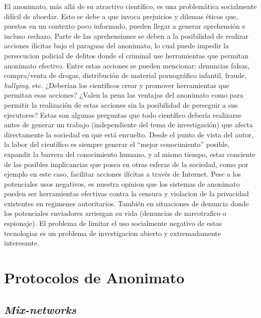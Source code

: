 El anonimato, más allá de su atractivo científico, es una problemática socialmente difícil de abordar. Esto se debe a que 
invoca prejuicios y dilemas éticos que, puestos en un contexto poco informado, pueden llegar a generar 
aprehensión e incluso rechazo. Parte de las aprehensiones se deben a la posibilidad de realizar acciones ilícitas 
bajo el paraguas del anonimato, lo cual puede impedir la persecucion policial de delitos donde el criminal use herramientas que permitan anonimato efectivo. Entre estas acciones se pueden mencionar: 
denuncias falsas, compra/venta de drogas, distribución de material pornográfico infantil, fraude, \emph{bullying}, etc. 
¿Deberían los científicos crear y promover herramientas que permitan esas acciones? 
¿Valen la pena las ventajas del anonimato como para permitir la realización de estas acciones sin la posibilidad de 
perseguir a sus ejecutores?
Estas son algunas preguntas que todo científico 
debería realizarse antes de generar un trabajo (independiente del tema de investigación) que afecta directamente la sociedad en que está envuelto. 
Desde el punto de vista 
del autor, la labor del científico es siempre generar el ``mejor conocimiento'' posible, expandir la barrera del conocimiento 
humano, y al mismo tiempo, estar conciente de las posibles implicancias que posea en otras esferas de la sociedad, como por ejemplo en este caso, 
facilitar acciones ilícitas a través de Internet. Pese a los potenciales usos negativos, es nuestra opinion que los sistemas de anonimato pueden ser herramientas efectivas contra la censura y violacion de la privacidad existentes en regimenes autoritarios. También en situaciones de denuncia donde los potenciales enviadores arriesgan su vida (denuncias de narcotrafico o espionaje). El problema de limitar el uso socialmente negativo de estas tecnologias es un problema de investigacion abierto y extremadamente interesante.  

\section{Protocolos de Anonimato}

\subsection{\emph{Mix-networks}}

